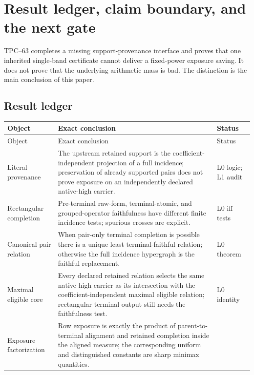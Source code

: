 \section{Result ledger, claim boundary, and the next gate}
\label{sec:tpc63-claims-next}

TPC--63 completes a missing support-provenance interface and proves that
one inherited single-band certificate cannot deliver a fixed-power
exposure saving.  It does not prove that the underlying arithmetic mass is
bad.  The distinction is the main conclusion of this paper.

\subsection{Result ledger}

\begingroup
\small
\begin{longtable}{>{\raggedright\arraybackslash}p{}
                 >{\raggedright\arraybackslash}p{}
                 >{\raggedright\arraybackslash}p{}}
\toprule
Object & Exact conclusion & Status\\
\midrule
\endfirsthead
\toprule
Object & Exact conclusion & Status\\
\midrule
\endhead
Literal provenance
& The upstream retained support is the coefficient-independent projection
  of a full incidence; preservation of already supported pairs does not
  prove exposure on an independently declared native-high carrier.
& L0 logic; L1 audit\\
\addlinespace
Rectangular completion
& Pre-terminal raw-form, terminal-atomic, and grouped-operator faithfulness
  have different finite incidence tests; spurious crosses are explicit.
& L0 iff tests\\
\addlinespace
Canonical pair relation
& When pair-only terminal completion is possible there is a unique least
  terminal-faithful relation; otherwise the full incidence hypergraph is
  the faithful replacement.
& L0 theorem\\
\addlinespace
Maximal eligible core
& Every declared retained relation selects the same native-high carrier as
  its intersection with the coefficient-independent maximal eligible
  relation; rectangular terminal output still needs the faithfulness test.
& L0 identity\\
\addlinespace
Exposure factorization
& Row exposure is exactly the product of parent-to-terminal alignment and
  retained completion inside the aligned measure; the corresponding
  uniform and distinguished constants are sharp minimax quantities.

\end{longtable}
